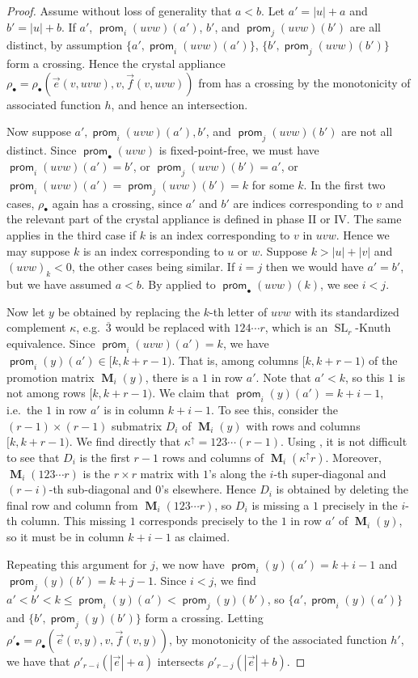 \documentclass{amsart}
\theoremstyle{definition}
\theoremstyle{remark}
\numberwithin{equation}{section}
\DeclareMathOperator{\prom}{\mathsf{prom}}
\DeclareMathOperator{\PM}{\mathbf{M}}
\DeclareMathOperator{\SL}{SL}
\begin{document}
\begin{proof}
  Assume without loss of generality that $a<b$. Let $a' = |u|+a$ and $b' = |u|+b$. If $a'$, $\prom_i(uvw)(a')$, $b'$, and $\prom_j(uvw)(b')$ are all distinct, by assumption $\{a', \prom_i(uvw)(a')\}$, $\{b', \prom_j(uvw)(b')\}$ form a crossing. Hence the crystal appliance $\rho_\bullet=\rho_\bullet (\vec{e}(v,uvw),v,\vec{f}(v,uvw))$ from  has a crossing by the monotonicity of associated function $h$, and hence an intersection.

  Now suppose $a', \prom_i(uvw)(a'), b'$, and $\prom_j(uvw)(b')$ are not all distinct. Since $\prom_\bullet(uvw)$ is fixed-point-free, we must have $\prom_i(uvw)(a') = b'$, or $\prom_j(uvw)(b') = a'$, or $\prom_i(uvw)(a') = \prom_j(uvw)(b') = k$ for some $k$. In the first two cases, $\rho_\bullet$ again has a crossing, since $a'$ and $b'$ are indices corresponding to $v$ and the relevant part of the crystal appliance is defined in phase II or IV. The same applies in the third case if $k$ is an index corresponding to $v$ in $uvw$. Hence we may suppose $k$ is an index corresponding to $u$ or $w$. Suppose $k > |u|+|v|$ and $(uvw)_k < 0$, the other cases being similar. If $i=j$ then we would have $a'=b'$, but we have assumed $a < b$. By  applied to $\prom_\bullet(uvw)(k)$, we see $i < j$.
  
  Now let $y$ be obtained by replacing the $k$-th letter of $uvw$ with its standardized complement $\kappa$, e.g.~$\overline{3}$ would be replaced with $124\cdots r$, which is an $\SL_r$-Knuth equivalence. Since $\prom_i(uvw)(a') = k$, we have $\prom_i(y)(a') \in [k, k+r-1)$. That is, among columns $[k, k+r-1)$ of the promotion matrix $\PM_i(y)$, there is a $1$ in row $a'$. Note that $a' < k$, so this $1$ is not among rows $[k, k+r-1)$. We claim that $\prom_i(y)(a') = k+i-1$, i.e.~the $1$ in row $a'$ is in column $k+i-1$. To see this, consider the $(r-1) \times (r-1)$ submatrix $D_i$ of $\PM_i(y)$ with rows and columns $[k, k+r-1)$. We find directly that $\kappa^\uparrow = 123\cdots(r-1)$. Using , it is not difficult to see that $D_i$ is the first $r-1$ rows and columns of $\PM_i(\kappa^\uparrow r)$. Moreover, $\PM_i(123\cdots r)$ is the $r \times r$ matrix with $1$'s along the $i$-th super-diagonal and $(r-i)$-th sub-diagonal and $0$'s elsewhere. Hence $D_i$ is obtained by deleting the final row and column from $\PM_i(123\cdots r)$, so $D_i$ is missing a $1$ precisely in the $i$-th column. This missing $1$ corresponds precisely to the $1$ in row $a'$ of $\PM_i(y)$, so it must be in column $k+i-1$ as claimed.

  Repeating this argument for $j$, we now have $\prom_i(y)(a') = k+i-1$ and $\prom_j(y)(b') = k+j-1$. Since $i < j$, we find $a' < b' < k \leq \prom_i(y)(a') < \prom_j(y)(b')$, so $\{a', \prom_i(y)(a')\}$ and $\{b', \prom_j(y)(b')\}$ form a crossing. Letting $\rho'_\bullet = \rho_\bullet(\vec{e}(v,y), v, \vec{f}(v,y))$, by monotonicity of the associated function $h'$, we have that $\rho'_{r-i}(|\vec{e}|+a)$ intersects $\rho'_{r-j}(|\vec{e}|+b)$.
\end{proof}
\end{document}
